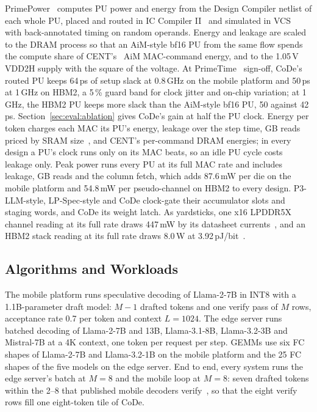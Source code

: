 PrimePower~\cite{synopsyspp} computes PU power and energy from the Design Compiler netlist of each whole PU, placed and
routed in IC Compiler II~\cite{synopsysicc2} and simulated in VCS~\cite{synopsysvcs} with back-annotated timing on random operands. Energy and leakage are scaled to the DRAM process so that an AiM-style bf16 PU from the same flow spends
the compute share of CENT's~\cite{cent} AiM MAC-command energy, and to the 1.05\,V VDD2H supply with the
square of the voltage\ASSUMPTION. At PrimeTime~\cite{synopsyspt} sign-off, CoDe's routed PU keeps
64\,ps of setup slack at 0.8\,GHz on the mobile platform and 50\,ps at 1\,GHz on HBM2, a 5\,\% guard band for clock
jitter and on-chip variation; at 1\,GHz, the HBM2 PU keeps more slack than the AiM-style bf16 PU, 50 against 42\,ps.
Section~\ref{sec:eval:ablation} gives CoDe's gain at half the PU clock. Energy per token charges each MAC its PU's energy, leakage over
the step time, GB reads priced by SRAM size~\cite{horowitz}, and CENT's per-command DRAM energies; in
every design a PU's clock runs only on its MAC beats, so an idle PU cycle costs leakage only\ASSUMPTION. Peak power
runs every PU at its full MAC rate and includes leakage, GB reads and the column fetch, which adds 87.6\,mW per die on
the mobile platform and 54.8\,mW per pseudo-channel on HBM2 to every design. P3-LLM-style, LP-Spec-style and CoDe
clock-gate their accumulator slots and staging words, and CoDe its weight latch. As yardsticks, one x16 LPDDR5X channel reading at its full rate draws 447\,mW by its
datasheet currents~\cite{micronlp5x}, and an HBM2 stack reading at its full rate draws 8.0\,W at
3.92\,pJ/bit~\cite{oconnor}.

\subsection{Algorithms and Workloads}
\label{sec:method:work}
The mobile platform runs speculative decoding of Llama-2-7B in INT8 with a 1.1B-parameter draft model: $M - 1$
drafted tokens and one verify pass of $M$ rows, acceptance rate 0.7 per token and context $L = 1024$. The edge server runs batched decoding of
Llama-2-7B and 13B, Llama-3.1-8B, Llama-3.2-3B and Mistral-7B at a 4K context, one token per request per step. GEMMs
use six FC shapes of Llama-2-7B and Llama-3.2-1B on the mobile platform and the 25 FC shapes of the five models on the
edge server. End to end, every system runs the edge server's batch at $M = 8$ and the mobile loop at $M = 8$: seven drafted
tokens within the 2--8 that published mobile decoders verify~\cite{sdnpu}, so that the eight verify rows fill one
eight-token tile of CoDe.

